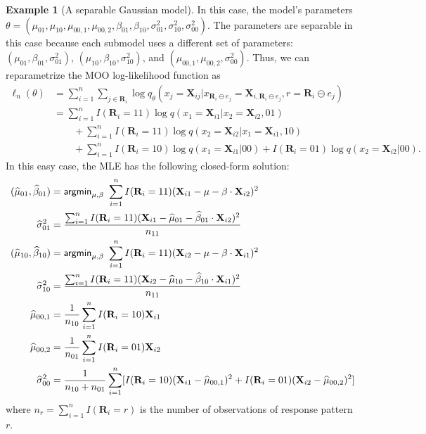 \documentclass[aos, preprint]{imsart}
\theoremstyle{plain}
\theoremstyle{definition}
\newtheorem*{example}{Example}
\let\hat\widehat
\newcommand{\bX}{\mathbf{X}}
\newcommand{\bR}{\mathbf{R}}
\begin{document}
\begin{appendix}
\begin{example}[A separable Gaussian model]
In this case, the model's parameters  $\theta = (\mu_{01}, \mu_{10}, \mu_{00,1}, \mu_{00,2}, \beta_{01}, \beta_{10}, \sigma^2_{01},\sigma^2_{10},\sigma^2_{00})$.
The parameters are separable in this case because each submodel uses a different set of parameters: $(\mu_{01}, \beta_{01}, \sigma^2_{01})$,
$(\mu_{10}, \beta_{10}, \sigma^2_{10})$, and $(\mu_{00,1}, \mu_{00,2}, \sigma^2_{00})$.
Thus, we can reparametrize the MOO log-likelihood function as 
\begin{equation}
\begin{aligned}
\ell_n(\theta) & = \sum_{i=1}^n\sum_{j \in \bR_i} \log q_\theta(x_j = \bX_{ij}|x_{\bR_i\ominus e_j} = \bX_{i, \bR_i\ominus e_j}, r = \bR_i\ominus e_j)\\
& = \sum_{i=1}^n I(\bR_i = 11) \log q(x_1 = \bX_{i1}|x_2 = \bX_{i2}, 01) \\
&\qquad+ \sum_{i=1}^n I(\bR_i = 11)\log q(x_2 = \bX_{i2}|x_1 = \bX_{i1}, 10) \\ 
&\qquad+ \sum_{i=1}^n I(\bR_i = 10) \log q(x_1 = \bX_{i1}| 00) + I(\bR_i = 01) \log q(x_2 = \bX_{i2}| 00).
\end{aligned}
\label{eq::sep}
\end{equation}
In this easy case, 
the MLE has the following closed-form solution: 
\begin{equation}
\begin{aligned}
(\hat  \mu_{01} ,\hat \beta_{01}) &= {\sf argmin}_{\mu ,\beta}\,\,  \sum_{i=1}^n I(\bR_i = 11) (\bX_{i1} - \mu - \beta\cdot \bX_{i2})^2\\
\hat \sigma^2_{01} &= \frac{\sum_{i=1}^n I(\bR_i = 11) (\bX_{i1} - \hat\mu_{01} - \hat\beta_{01}\cdot \bX_{i2})^2}{n_{11} }\\
(\hat  \mu_{10} ,\hat \beta_{10}) &= {\sf argmin}_{\mu ,\beta}\,\,  \sum_{i=1}^n I(\bR_i = 11) (\bX_{i2} - \mu - \beta\cdot \bX_{i1})^2\\
\hat \sigma^2_{10} &= \frac{\sum_{i=1}^n I(\bR_i = 11) (\bX_{i2} - \hat\mu_{10} - \hat\beta_{10}\cdot \bX_{i1})^2}{n_{11}}\\
\hat \mu_{00,1} & = \frac{1}{n_{10}}\sum_{i=1}^n I(\bR_i = 10) \bX_{i1}\\
\hat \mu_{00,2} & = \frac{1}{n_{01}}\sum_{i=1}^n I(\bR_i = 01) \bX_{i2}\\
\hat \sigma^2_{00} & = \frac{1}{n_{10}+n_{01}}\sum_{i=1}^n [I(\bR_i = 10) (\bX_{i1}-\hat \mu_{00,1})^2 + I(\bR_i=01) (\bX_{i2}-\hat \mu_{00,2})^2]
\end{aligned}
\label{eq::mle}
\end{equation}
where $n_r = \sum_{i=1}^n I(\bR_i=r)$ is the number of observations of response pattern $r$.
\end{example}



\end{appendix}
\end{document}
